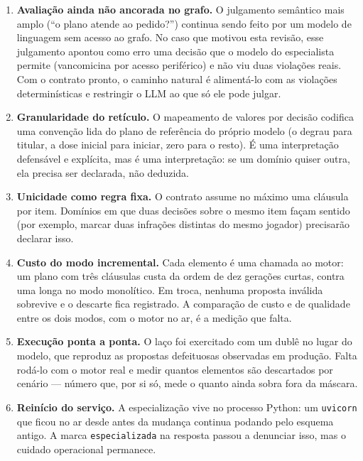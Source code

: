 \documentclass[11pt,a4paper]{article}
\begin{document}
\begin{enumerate}[leftmargin=*,itemsep=2pt]
\item \textbf{Avaliação ainda não ancorada no grafo.} O julgamento semântico
mais amplo (``o plano atende ao pedido?'') continua sendo feito por um modelo de
linguagem sem acesso ao grafo. No caso que motivou esta revisão, esse julgamento
apontou como erro uma decisão que o modelo do especialista permite (vancomicina
por acesso periférico) e não viu duas violações reais. Com o contrato pronto, o
caminho natural é alimentá-lo com as violações determinísticas e restringir o
LLM ao que só ele pode julgar.

\item \textbf{Granularidade do retículo.} O mapeamento de valores por decisão
codifica uma convenção lida do plano de referência do próprio modelo (o degrau
para titular, a dose inicial para iniciar, zero para o resto). É uma
interpretação defensável e explícita, mas é uma interpretação: se um domínio
quiser outra, ela precisa ser declarada, não deduzida.

\item \textbf{Unicidade como regra fixa.} O contrato assume no máximo uma
cláusula por item. Domínios em que duas decisões sobre o mesmo item façam
sentido (por exemplo, marcar duas infrações distintas do mesmo jogador)
precisarão declarar isso.

\item \textbf{Custo do modo incremental.} Cada elemento é uma chamada ao motor:
um plano com três cláusulas custa da ordem de dez gerações curtas, contra uma
longa no modo monolítico. Em troca, nenhuma proposta inválida sobrevive e o
descarte fica registrado. A comparação de custo e de qualidade entre os dois
modos, com o motor no ar, é a medição que falta.

\item \textbf{Execução ponta a ponta.} O laço foi exercitado com um dublê no
lugar do modelo, que reproduz as propostas defeituosas observadas em produção.
Falta rodá-lo com o motor real e medir quantos elementos são descartados por
cenário --- número que, por si só, mede o quanto ainda sobra fora da máscara.

\item \textbf{Reinício do serviço.} A especialização vive no processo Python: um
\texttt{uvicorn} que ficou no ar desde antes da mudança continua podando pelo
esquema antigo. A marca \texttt{especializada} na resposta passou a denunciar
isso, mas o cuidado operacional permanece.
\end{enumerate}
\end{document}
